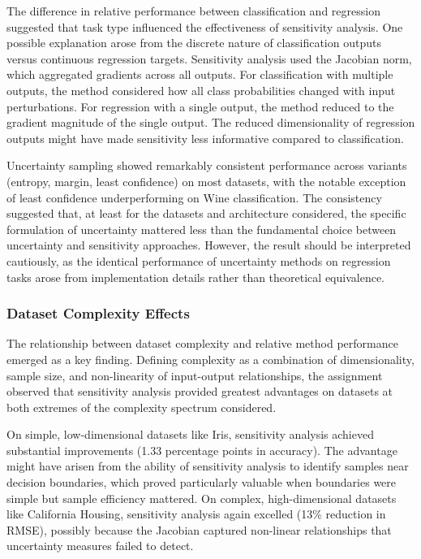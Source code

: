 \documentclass[conference]{IEEEtran}
\begin{document}
The difference in relative performance between classification and regression suggested that task type influenced the effectiveness of sensitivity analysis. One possible explanation arose from the discrete nature of classification outputs versus continuous regression targets. Sensitivity analysis used the Jacobian norm, which aggregated gradients across all outputs. For classification with multiple outputs, the method considered how all class probabilities changed with input perturbations. For regression with a single output, the method reduced to the gradient magnitude of the single output. The reduced dimensionality of regression outputs might have made sensitivity less informative compared to classification.

Uncertainty sampling showed remarkably consistent performance across variants (entropy, margin, least confidence) on most datasets, with the notable exception of least confidence underperforming on Wine classification. The consistency suggested that, at least for the datasets and architecture considered, the specific formulation of uncertainty mattered less than the fundamental choice between uncertainty and sensitivity approaches. However, the result should be interpreted cautiously, as the identical performance of uncertainty methods on regression tasks arose from implementation details rather than theoretical equivalence.

\subsubsection{Dataset Complexity Effects}

The relationship between dataset complexity and relative method performance emerged as a key finding. Defining complexity as a combination of dimensionality, sample size, and non-linearity of input-output relationships, the assignment observed that sensitivity analysis provided greatest advantages on datasets at both extremes of the complexity spectrum considered.

On simple, low-dimensional datasets like Iris, sensitivity analysis achieved substantial improvements (1.33 percentage points in accuracy). The advantage might have arisen from the ability of sensitivity analysis to identify samples near decision boundaries, which proved particularly valuable when boundaries were simple but sample efficiency mattered. On complex, high-dimensional datasets like California Housing, sensitivity analysis again excelled (13\% reduction in RMSE), possibly because the Jacobian captured non-linear relationships that uncertainty measures failed to detect.
\end{document}
